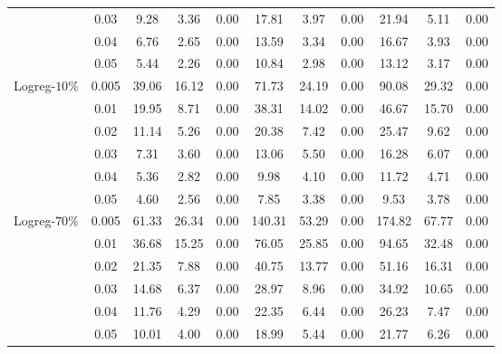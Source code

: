 \documentclass[11pt,a5paper,twoside]{book}
\begin{document}
{{\begin{table}[ht]
{\begin{tabular}{lcccccccccc}
  &0.03 & 9.28 & 3.36 & 0.00 & 17.81 & 3.97 & 0.00 & 21.94 & 5.11 & 0.00 \\ 
  &0.04 & 6.76 & 2.65 & 0.00 & 13.59 & 3.34 & 0.00 & 16.67 & 3.93 & 0.00 \\ 
  &0.05 & 5.44 & 2.26 & 0.00 & 10.84 & 2.98 & 0.00 & 13.12 & 3.17 & 0.00 \\ \hline
\multirow{6}{*}{Logreg-$10\%$}  &0.005 & 39.06 & 16.12 & 0.00 & 71.73 & 24.19 & 0.00 & 90.08 & 29.32 & 0.00 \\ 
  &0.01 & 19.95 & 8.71 & 0.00 & 38.31 & 14.02 & 0.00 & 46.67 & 15.70 & 0.00 \\ 
  &0.02 & 11.14 & 5.26 & 0.00 & 20.38 & 7.42 & 0.00 & 25.47 & 9.62 & 0.00 \\ 
  &0.03 & 7.31 & 3.60 & 0.00 & 13.06 & 5.50 & 0.00 & 16.28 & 6.07 & 0.00 \\ 
  &0.04 & 5.36 & 2.82 & 0.00 & 9.98 & 4.10 & 0.00 & 11.72 & 4.71 & 0.00 \\ 
  &0.05 & 4.60 & 2.56 & 0.00 & 7.85 & 3.38 & 0.00 & 9.53 & 3.78 & 0.00 \\ \hline
\multirow{6}{*}{Logreg-$70\%$}  &0.005 & 61.33 & 26.34 & 0.00 & 140.31 & 53.29 & 0.00 & 174.82 & 67.77 & 0.00 \\ 
  &0.01 & 36.68 & 15.25 & 0.00 & 76.05 & 25.85 & 0.00 & 94.65 & 32.48 & 0.00 \\ 
  &0.02 & 21.35 & 7.88 & 0.00 & 40.75 & 13.77 & 0.00 & 51.16 & 16.31 & 0.00 \\ 
  &0.03 & 14.68 & 6.37 & 0.00 & 28.97 & 8.96 & 0.00 & 34.92 & 10.65 & 0.00 \\ 
  &0.04 & 11.76 & 4.29 & 0.00 & 22.35 & 6.44 & 0.00 & 26.23 & 7.47 & 0.00 \\ 
  &0.05 & 10.01 & 4.00 & 0.00 & 18.99 & 5.44 & 0.00 & 21.77 & 6.26 & 0.00 \\ 
   \hline
\end{tabular}}
\end{table}


}}
\end{document}
